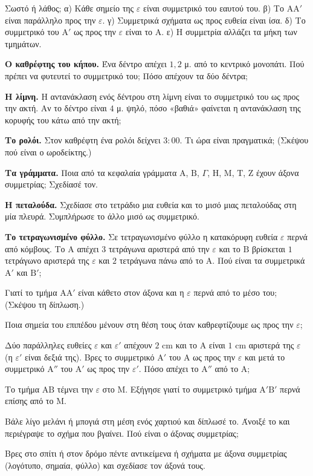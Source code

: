 \ex Σωστό ή λάθος; α) Κάθε σημείο της $\varepsilon$ είναι συμμετρικό του εαυτού του. \quad β) Το $\mathrm{ΑΑ}'$ είναι παράλληλο προς την $\varepsilon$. \quad γ) Συμμετρικά σχήματα ως προς ευθεία είναι ίσα. \quad δ) Το συμμετρικό του $\mathrm{Α}'$ ως προς την $\varepsilon$ είναι το $\mathrm{Α}$. \quad ε) Η συμμετρία αλλάζει τα μήκη των τμημάτων.


\ex \textbf{Ο καθρέφτης του κήπου.} Ένα δέντρο απέχει $1{,}2$ μ. από το κεντρικό μονοπάτι. Πού πρέπει να φυτευτεί το συμμετρικό του; Πόσο απέχουν τα δύο δέντρα;

\ex \textbf{Η λίμνη.} Η αντανάκλαση ενός δέντρου στη λίμνη είναι το συμμετρικό του ως προς την ακτή. Αν το δέντρο είναι $4$ μ. ψηλό, πόσο «βαθιά» φαίνεται η αντανάκλαση της κορυφής του κάτω από την ακτή;

\ex \textbf{Το ρολόι.} Στον καθρέφτη ένα ρολόι δείχνει $3{:}00$. Τι ώρα είναι πραγματικά; (Σκέψου πού είναι ο ωροδείκτης.)

\ex \textbf{Τα γράμματα.} Ποια από τα κεφαλαία γράμματα $\mathrm{Α}$, $\mathrm{Β}$, $\Gamma$, $\mathrm{Η}$, $\mathrm{Μ}$, $\mathrm{Τ}$, $\mathrm{Ζ}$ έχουν άξονα συμμετρίας; Σχεδίασέ τον.

\ex \textbf{Η πεταλούδα.} Σχεδίασε στο τετράδιο μια ευθεία και το μισό μιας πεταλούδας στη μία πλευρά. Συμπλήρωσε το άλλο μισό ως συμμετρικό.

\ex \textbf{Το τετραγωνισμένο φύλλο.} Σε τετραγωνισμένο φύλλο η κατακόρυφη ευθεία $\varepsilon$ περνά από κόμβους. Το $\mathrm{Α}$ απέχει $3$ τετράγωνα αριστερά από την $\varepsilon$ και το $\mathrm{Β}$ βρίσκεται $1$ τετράγωνο αριστερά της $\varepsilon$ και $2$ τετράγωνα πάνω από το $\mathrm{Α}$. Πού είναι τα συμμετρικά $\mathrm{Α}'$ και $\mathrm{Β}'$;


\ex Γιατί το τμήμα $\mathrm{ΑΑ}'$ είναι κάθετο στον άξονα και η $\varepsilon$ περνά από το μέσο του; (Σκέψου τη δίπλωση.)

\ex Ποια σημεία του επιπέδου μένουν στη θέση τους όταν καθρεφτίζουμε ως προς την $\varepsilon$;

\ex Δύο παράλληλες ευθείες $\varepsilon$ και $\varepsilon'$ απέχουν $2$ cm και το $\mathrm{Α}$ είναι $1$ cm αριστερά της $\varepsilon$ (η $\varepsilon'$ είναι δεξιά της). Βρες το συμμετρικό $\mathrm{Α}'$ του $\mathrm{Α}$ ως προς την $\varepsilon$ και μετά το συμμετρικό $\mathrm{Α}''$ του $\mathrm{Α}'$ ως προς την $\varepsilon'$. Πόσο απέχει το $\mathrm{Α}''$ από το $\mathrm{Α}$;

\ex Το τμήμα $\mathrm{ΑΒ}$ τέμνει την $\varepsilon$ στο $\mathrm{Μ}$. Εξήγησε γιατί το συμμετρικό τμήμα $\mathrm{Α}'\mathrm{Β}'$ περνά επίσης από το $\mathrm{Μ}$.


\ex Βάλε λίγο μελάνι ή μπογιά στη μέση ενός χαρτιού και δίπλωσέ το. Άνοιξέ το και περιέγραψε το σχήμα που βγαίνει. Πού είναι ο άξονας συμμετρίας;

\ex Βρες στο σπίτι ή στον δρόμο πέντε αντικείμενα ή σχήματα με άξονα συμμετρίας (λογότυπο, σημαία, φύλλο) και σχεδίασε τον άξονά τους.
